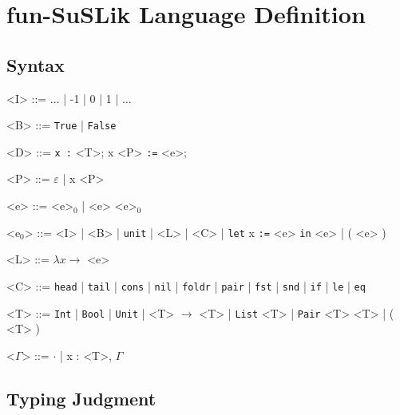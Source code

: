 \documentclass[10pt]{article}
\newcommand{\ttt}[1]{\texttt{#1}}
\newcommand{\ra}{\ensuremath{\rightarrow}}
\newcommand{\head}{\ttt{head}}
\newcommand{\tail}{\ttt{tail}}
\newcommand{\cons}{\ttt{cons}}
\newcommand{\nil}{\ttt{nil}}
\newcommand{\foldr}{\ttt{foldr}}
\newcommand{\pair}{\ttt{pair}}
\newcommand{\fst}{\ttt{fst}}
\newcommand{\snd}{\ttt{snd}}
\newcommand{\ite}{\ttt{if}}
\newcommand{\letbnd}{\ttt{let}}
\newcommand{\inexpr}{\ttt{in}}
\newcommand{\lesseq}{\ttt{le}}
\newcommand{\eq}{\ttt{eq}}
\begin{document}
\section{fun-SuSLik Language Definition}
\label{sec:FSDef}
\subsection{Syntax}

\begin{grammar}
  <I> ::= ... | -1 | 0 | 1 | ...

  <B> ::= \ttt{True} | \ttt{False}

  <D> ::= \ttt{x :} <T>; x <P> \ttt{:=} <e>;

  <P> ::= $\varepsilon$ | x <P>

  <e> ::= <e>$_0$ | <e> <e>$_0$

  <e$_0$> ::= <I> | <B> | \ttt{unit} | <L> | <C> | \letbnd\; x \ttt{:=} <e> \inexpr\; <e> | ( <e> )

  <L> ::= $\lambda x \ra$ <e>

  <C> ::= \head\; | \tail\; | \cons\; | \nil\; | \foldr\; | \pair\; | \fst\; | \snd\; | \ite\; | \lesseq\; | \eq

  <T> ::= \ttt{Int} | \ttt{Bool} | \ttt{Unit} | <T> $\ra$ <T> | \ttt{List} <T> | \ttt{Pair} <T> <T> | ( <T> )

  <$\Gamma$> ::= $\cdot$ | x : <T>, $\Gamma$
\end{grammar}

\subsection{Typing Judgment}
\end{document}
